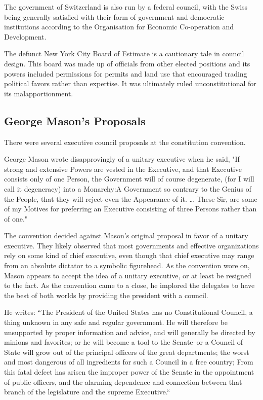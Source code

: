 \documentclass{article}
\begin{document}
The government of Switzerland is also run by a federal council, with the Swiss being generally satisfied with their form of government and democratic institutions according to the Organisation for Economic Co-operation and Development\cite{Kaufman}.

The defunct New York City Board of Estimate is a cautionary tale in council design. This board was made up of officials from other elected positions and its powers included permissions for permits and land use that encouraged trading political favors rather than expertise\cite{Purnick}. It was ultimately ruled unconstitutional for its malapportionment\cite{Board_of_Estimate}.

\subsection{George Mason's Proposals}

There were several executive council proposals at the constitution convention.

George Mason wrote disapprovingly of a unitary executive when he said, "If strong and extensive Powers are vested in the Executive, and that Executive consists only of one Person, the Government will of course degenerate, (for I will call it degeneracy) into a Monarchy:A Government so contrary to the Genius of the People, that they will reject even the Appearance of it. … These Sir, are some of my Motives for preferring an Executive consisting of three Persons rather than of one."\cite{Mason}

The convention decided against Mason's original proposal in favor of a unitary executive. They likely observed that most governments and effective organizations rely on some kind of chief executive, even though that chief executive may range from an absolute dictator to a symbolic figurehead. As the convention wore on, Mason appears to accept the idea of a unitary executive, or at least be resigned to the fact. As the convention came to a close, he implored the delegates to  have the best of both worlds by providing the president with a council.

He writes: “The President of the United States has no Constitutional Council, a thing unknown in any safe and regular government. He will therefore be unsupported by proper information and advice, and will generally be directed by minions and favorites; or he will become a tool to the Senate--or a Council of State will grow out of the principal officers of the great departments; the worst and most dangerous of all ingredients for such a Council in a free country; From this fatal defect has arisen the improper power of the Senate in the appointment of public officers, and the alarming dependence and connection between that branch of the legislature and the supreme Executive.“\cite{Mason_Objection}
\end{document}

